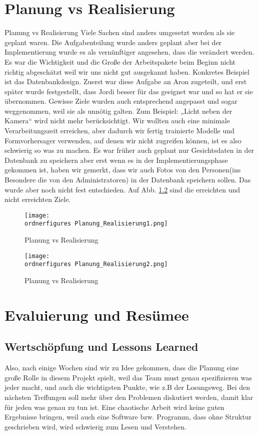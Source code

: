 \chapter{Planung vs Realisierung}
Planung vs Realisierung 
Viele Sachen sind anders umgesetzt worden als sie geplant waren. Die Aufgabenteilung wurde anders geplant aber bei der Implementierung wurde es als vernünftiger angesehen, dass die verändert werden. 
Es war die Wichtigkeit und die Große der Arbeitspakete beim Beginn nicht richtig abgeschätzt weil wir uns nicht gut ausgekannt haben.
Konkretes Beispiel ist das Datenbankdesign. Zuerst war diese Aufgabe an Aron zugeteilt, und erst später wurde festgestellt, dass Jordi besser für das geeignet war und so hat er sie übernommen. 
Gewisse Ziele wurden auch entsprechend angepasst und sogar weggenommen, weil sie als unnötig galten.  Zum Beispiel: „Licht neben der Kamera“ wird nicht mehr berücksichtigt.
Wir wollten auch eine minimale Verarbeitungszeit erreichen, aber dadurch wir fertig trainierte Modelle und Formvorhersager verwenden, auf denen wir nicht zugreifen können, ist es also schwierig so was zu machen. 
Es war früher auch geplant nur Gesichtsdaten in der Datenbank zu speichern aber erst wenn es in der Implementierungsphase gekommen ist, haben wir gemerkt, dass wir auch Fotos von den Personen(ins Besondere die von den Administratoren) in der Datenbank speichern sollen. Das wurde aber noch nicht fest entschieden. Auf Abb. \ref{fig:Planung_Realisierung} sind die erreichten und nicht erreichten Ziele.
\begin{figure}[H]
	\texttt{[image: \\ordnerfigures Planung\_Realisierung1.png]}
	\caption{Planung vs Realisierung}
	\label{fig:Planung_Realisierung}
\end{figure}
\begin{figure}[H]
	\texttt{[image: \\ordnerfigures Planung\_Realisierung2.png]}
	\caption{Planung vs Realisierung}
	\label{fig:Planung_Realisierung}
\end{figure}
\chapter{Evaluierung und Resümee}
\section{Wertschöpfung und Lessons Learned}
Also, nach einige Wochen sind wir zu Idee gekommen, dass die Planung eine große Rolle in diesem Projekt spielt, weil das Team must genau spezifizieren was jeder macht, und auch die wichtigsten Punkte, wie z.B der Losungsweg. Bei den nächsten Treffungen soll mehr über den Problemen diskutiert werden, damit klar für jeden was genau zu tun ist. Eine chaotische Arbeit wird keine guten Ergebnisse bringen, weil auch eine Software bzw. Programm, dass ohne Struktur geschrieben wird, wird schwierig zum Lesen und Verstehen.